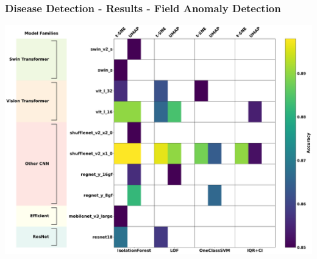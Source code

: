 \documentclass[aspectratio=43]{beamer}
\begin{document}
\begin{frame}
    \frametitle{\small Disease Detection - Results - Field Anomaly Detection}
        \centering
        \includegraphics[width=0.9\linewidth]{Imgs/Plant_Pathology_Dataset_Anomaly_Detection_Performance.pdf}
\end{frame}
\end{document}
